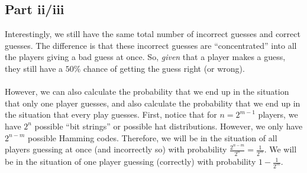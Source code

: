 \documentclass[letterpaper]{article}
\begin{document}
\subsection{Part ii/iii}
\label{subsec:10Partii+iii}

Interestingly, we still have the same total number of incorrect guesses and correct guesses.
The difference is that these incorrect guesses are ``concentrated'' into all the players giving a bad guess at once.
So, \textit{given} that a player makes a guess, they still have a $ 50\% $ chance of getting the guess right (or wrong).
\\ \\
However, we can also calculate the probability that we end up in the situation that only one player guesses, and also calculate the probability that we end up in the situation that every play guesses.
First, notice that for $ n = 2^{m - 1} $ players, we have $ 2^n $ possible ``bit strings'' or possible hat distributions.
However, we only have $ 2^{n - m} $ possible Hamming codes.
Therefore, we will be in the situation of all players guessing at once (and incorrectly so) with probability $ \frac{2^{n - m}}{2^n} = \frac{1}{2^m} $.
We will be in the situation of one player guessing (correctly) with probability $ 1 - \frac{1}{2^m} $.
\end{document}
